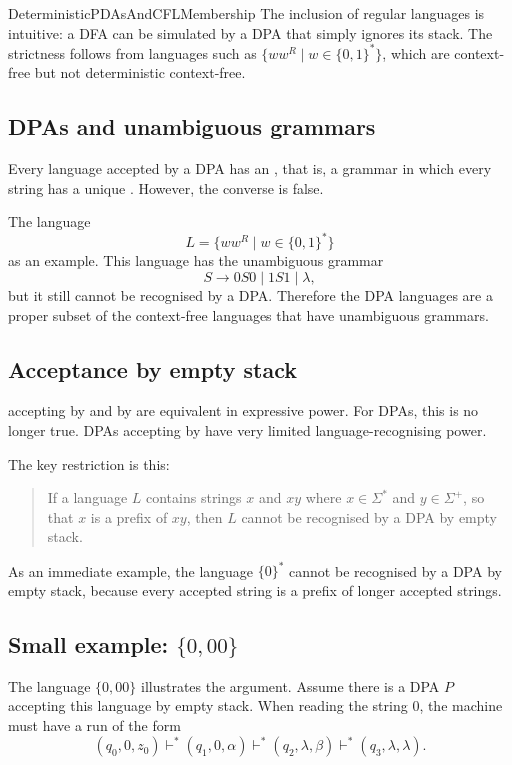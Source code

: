 \documentclass[hidelinks]{article}
\begin{document}
\begin{smodule}[title={Deterministic PDAs and CFL Membership}]{DeterministicPDAsAndCFLMembership}
The inclusion of regular languages is intuitive: a DFA can be simulated by a DPA that simply ignores its stack.
The strictness follows from languages such as $\{ww^R \mid w \in \{0,1\}^*\}$, which are context-free but not deterministic context-free.

\subsection{DPAs and unambiguous grammars}

Every language accepted by a DPA has an , that is, a grammar in which every string has a unique .
However, the converse is false.

The language
\[
L = \{ww^R \mid w \in \{0,1\}^*\}
\]
as an example.
This language has the unambiguous grammar
\[
S \to 0S0 \mid 1S1 \mid \lambda,
\]
but it still cannot be recognised by a DPA.
Therefore the DPA languages are a proper subset of the context-free languages that have unambiguous grammars.

\subsection{Acceptance by empty stack}

 accepting by  and by  are equivalent in expressive power.
For DPAs, this is no longer true.
DPAs accepting by  have very limited language-recognising power.

The key restriction is this:
\begin{quote}
If a language $L$ contains strings $x$ and $xy$ where $x \in \Sigma^*$ and $y \in \Sigma^+$, so that $x$ is a prefix of $xy$, then $L$ cannot be recognised by a DPA by empty stack.
\end{quote}

As an immediate example, the language $\{0\}^*$ cannot be recognised by a DPA by empty stack, because every accepted string is a prefix of longer accepted strings.

\subsection{Small example: $\{0,00\}$}

The language $\{0,00\}$ illustrates the argument.
Assume there is a DPA $P$ accepting this language by empty stack.
When reading the string $0$, the machine must have a run of the form
\[
(q_0,0,z_0) \vdash^* (q_1,0,\alpha) \vdash^* (q_2,\lambda,\beta) \vdash^* (q_3,\lambda,\lambda).
\]


\end{smodule}
\end{document}

